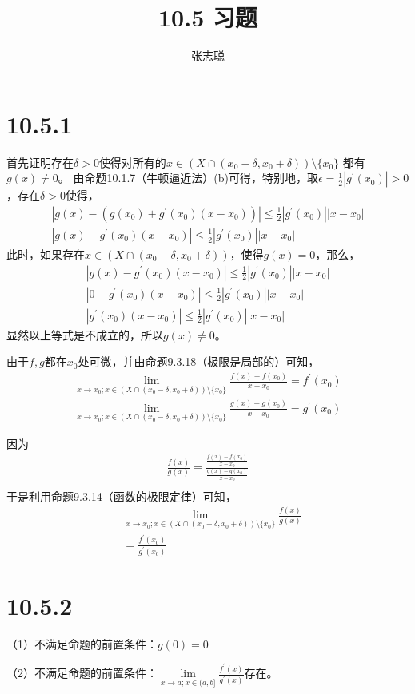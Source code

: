 \documentclass{article}
\begin{document}
\title{10.5 习题}
\author{张志聪}
\maketitle

\section*{10.5.1}

首先证明存在$\delta > 0$使得对所有的$x \in \left( X \cap (x_0 - \delta, x_0 + \delta) \right) \setminus \{x_0\}$
都有$g(x) \neq 0$。
由命题10.1.7（牛顿逼近法）(b)可得，特别地，取$\epsilon = \frac{1}{2}|g^\prime(x_0)| > 0$，存在$\delta > 0$使得，
\begin{align*}
  |g(x) - (g(x_0) + g^\prime(x_0)(x - x_0))| \leq \frac{1}{2}|g^\prime(x_0)||x - x_0| \\
  |g(x) - g^\prime(x_0)(x - x_0)| \leq \frac{1}{2}|g^\prime(x_0)||x - x_0|
\end{align*}
此时，如果存在$x \in (X \cap (x_0 - \delta, x_0 + \delta))$，使得$g(x) = 0$，那么，
\begin{align*}
  |g(x) - g^\prime(x_0)(x - x_0)| \leq \frac{1}{2}|g^\prime(x_0)||x - x_0| \\
  |0 - g^\prime(x_0)(x - x_0)| \leq \frac{1}{2}|g^\prime(x_0)||x - x_0|    \\
  |g^\prime(x_0)(x - x_0)| \leq \frac{1}{2}|g^\prime(x_0)||x - x_0|
\end{align*}
显然以上等式是不成立的，所以$g(x) \neq 0$。

由于$f, g$都在$x_0$处可微，并由命题9.3.18（极限是局部的）可知，
\begin{align*}
  \lim\limits_{x \to x_0; x \in (X \cap (x_0 - \delta, x_0 + \delta)) \setminus \{x_0\}} \frac{f(x) - f(x_0)}{x - x_0} = f^\prime(x_0) \\
  \lim\limits_{x \to x_0; x \in (X \cap (x_0 - \delta, x_0 + \delta)) \setminus \{x_0\}} \frac{g(x) - g(x_0)}{x - x_0} = g^\prime(x_0)
\end{align*}

因为
\begin{align*}
   \frac{f(x)}{g(x)} = \frac{\frac{f(x) - f(x_0)}{x - x_0}}{\frac{g(x) - g(x_0)}{x - x_0}} \\
\end{align*}
于是利用命题9.3.14（函数的极限定律）可知，
\begin{align*}
   & \lim\limits_{x \to x_0; x \in (X \cap (x_0 - \delta, x_0 + \delta)) \setminus \{x_0\}} \frac{f(x)}{g(x)} \\
   & = \frac{f^\prime(x_0)}{g^\prime(x_0)}
\end{align*}

\section*{10.5.2}

（1）不满足命题的前置条件：$g(0) = 0$

（2）不满足命题的前置条件：$\lim\limits_{x \to a; x \in (a, b]} \frac{f^\prime(x)}{g^\prime(x)}$存在。
\end{document}
